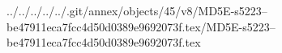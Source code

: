 ../../../../../.git/annex/objects/45/v8/MD5E-s5223--be47911eca7fcc4d50d0389e9692073f.tex/MD5E-s5223--be47911eca7fcc4d50d0389e9692073f.tex